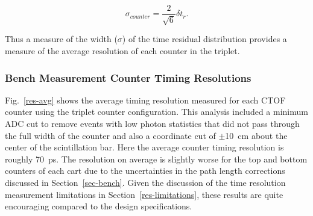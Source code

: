 \documentclass{elsart}
\begin{document}
\begin{equation}
\label{sig-counter}
\sigma_{counter} = \frac{2}{\sqrt{6}} \delta t_r.
\end{equation}

\noindent
Thus a measure of the width ($\sigma$) of the time residual distribution provides a measure of the
average resolution of each counter in the triplet. 

\subsubsection{Bench Measurement Counter Timing Resolutions}
\label{bench-tres}

Fig.~\ref{res-avg} shows the average timing resolution measured for each CTOF counter using the
triplet counter configuration. This analysis included a minimum ADC cut to remove events with low
photon statistics that did not pass through the full width of the counter and also a coordinate cut of
$\pm$10~cm about the center of the scintillation bar. Here the average counter timing resolution is
roughly 70~ps. The resolution on average is slightly worse for the top and bottom counters of each
cart due to the uncertainties in the path length corrections discussed in Section~\ref{sec-bench}.
Given the discussion of the time resolution measurement limitations in Section~\ref{res-limitations},
these results are quite encouraging compared to the design specifications.
\end{document}
